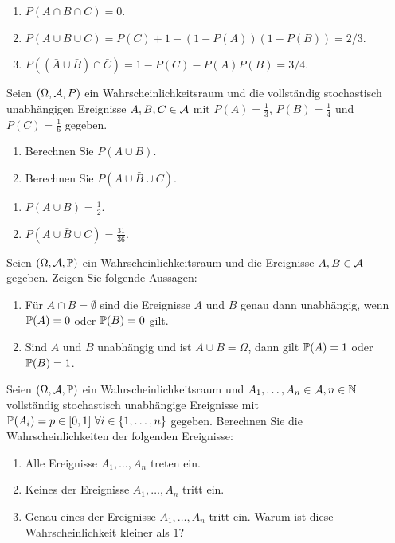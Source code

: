 \solution
\begin{enumerate}
    \item $P(A \cap B \cap C) = 0$.
    \item $P(A \cup B \cup C) = P(C) + 1 - (1 - P(A))(1-P(B)) = 2/3$.
    \item $P( ( \bar A \cup \bar B) \cap \bar C ) = 1 - P(C) - P(A)P(B) = 3/4$.
\end{enumerate}

Seien $(\Omega, \mathcal A, P)$ ein Wahrscheinlichkeitsraum und die vollständig
stochastisch unabhängigen Ereignisse $A, B, C \in \mathcal A$ mit $P(A)=\frac{1}{3}$,
$P(B)=\frac{1}{4}$ und $P(C)=\frac{1}{6}$ gegeben.
\begin{enumerate}
    \item Berechnen Sie $P(A \cup B)$.
    \item Berechnen Sie $P( A \cup \bar B \cup C)$.
\end{enumerate}

\solution
\begin{enumerate}
    \item $P(A \cup B) = \frac{1}{2}$. %
    \item $P(A \cup \bar B \cup C) = \frac{31}{36}$.  %
\end{enumerate}

 Seien $(\Omega, \mathcal A, \mathbb P)$ ein
Wahrscheinlichkeitsraum und die Ereignisse $A,B \in \mathcal A$ gegeben. Zeigen Sie
folgende Aussagen:
\begin{enumerate}
    \item Für $A\cap B=\emptyset$ sind die Ereignisse $A$ und $B$ genau dann
        unabhängig, wenn $\mathbb P(A)=0$ oder $\mathbb P(B)=0$ gilt.

    \item Sind $A$ und $B$ unabhängig und ist $A \cup B = \Omega$, dann gilt
        $\mathbb P(A)=1$ oder $\mathbb P(B)=1$. 
\end{enumerate}


 Seien $(\Omega,
\mathcal A, \mathbb P)$ ein Wahrscheinlichkeitsraum und $A_1,\dots, A_n \in\mathcal A, n\in\mathbb N$
vollständig stochastisch unabhängige Ereignisse mit $\mathbb P(A_i)=p\in[0,1]\ \forall
i\in \left\{ 1,\dots,n \right\}$ gegeben. Berechnen Sie die
Wahrscheinlichkeiten der folgenden Ereignisse:
\begin{enumerate}
    \item Alle Ereignisse $A_1,\dots, A_n$ treten ein.
    \item Keines der Ereignisse $A_1, \dots, A_n$ tritt ein. 
    \item Genau eines der Ereignisse $A_1, \dots, A_n$ tritt ein. Warum 
        ist diese Wahrscheinlichkeit kleiner als $1$?
\end{enumerate}

